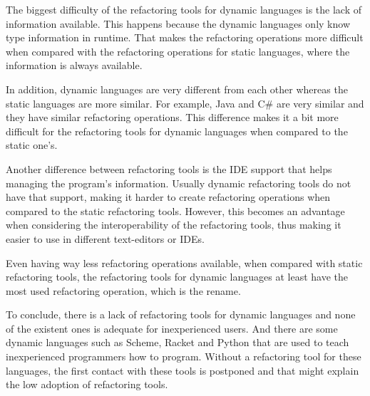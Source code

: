 The biggest difficulty of the refactoring tools for dynamic languages is the lack of information available. 
This happens because the dynamic languages only know type information in runtime. 
That makes the refactoring operations more difficult when compared with the refactoring operations for static languages, where the information is always available.

In addition, dynamic languages are very different from each other whereas the static languages are more similar.
For example, Java and C\# are very similar and they have similar refactoring operations.
This difference makes it a bit more difficult for the refactoring tools for dynamic languages when compared to the static one's. %

Another difference between refactoring tools is the IDE support that helps managing the program's information.
Usually dynamic refactoring tools do not have that support, making it harder to create refactoring operations when compared to the static refactoring tools.
However, this becomes an advantage when considering the interoperability of the refactoring tools, thus making it easier to use in different text-editors or IDEs.

Even having way less refactoring operations available, when compared with static refactoring tools, the refactoring tools for dynamic languages at least have the most used refactoring operation, which is the rename.









To conclude, there is a lack of refactoring tools for dynamic languages and none of the existent ones is adequate for inexperienced users. 
And there are some dynamic languages such as Scheme, Racket and Python that are used to teach inexperienced programmers how to program.
Without a refactoring tool for these languages, the first contact with these tools is postponed and that might explain the low adoption of refactoring tools.
